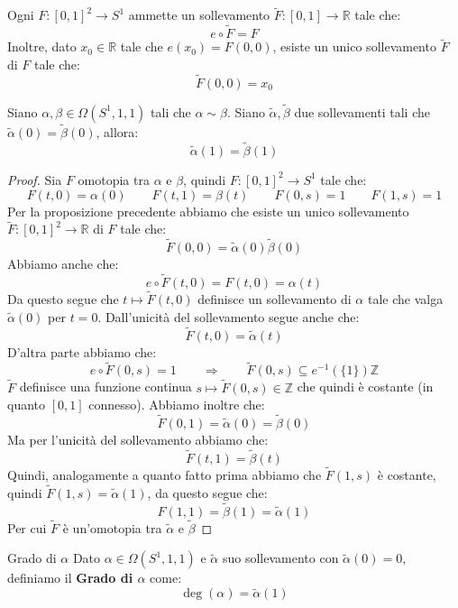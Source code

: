 \documentclass[11pt,a4paper,twoside]{article}
\theoremstyle{definition}
\begin{document}
\begin{prop}{}{}
	Ogni $F:[0,1]^2 \to S^1$ ammette un sollevamento $\tilde F:[0,1] \to \mathbb R$ tale che:
	\[e \circ \tilde F = F \]
	Inoltre, dato $x_0 \in \mathbb R$ tale che $e(x_0) = F(0,0)$, esiste un unico sollevamento $\tilde F$ di $F$ tale che:
	\[ \tilde F(0,0) = x_0 \]
\end{prop}

\begin{cor}{}{}
	Siano $\alpha, \beta \in \Omega(S^1,1,1)$ tali che $\alpha \sim \beta$. Siano $\tilde \alpha, \tilde \beta$ due sollevamenti tali che $\tilde \alpha (0) = \tilde \beta(0)$, allora:
	\[ \tilde \alpha(1) = \tilde \beta(1) \]
\end{cor}

\begin{proof}
	Sia $F$ omotopia tra $\alpha$ e $\beta$, quindi $F:[0,1]^2 \to S^1$ tale che:
	\[ F(t,0) = \alpha(0)\qquad F(t,1) = \beta(t)\qquad F(0,s) = 1\qquad F(1,s) = 1 \]
	Per la proposizione precedente abbiamo che esiste un unico sollevamento $\tilde F:[0,1]^2 \to \mathbb R$ di $F$ tale che:
	\[ \tilde F(0,0) = \tilde \alpha(0) \tilde \beta(0) \]
	Abbiamo anche che:
	\[ e \circ \tilde F(t,0) = F(t,0) = \alpha(t) \]
	Da questo segue che $t \mapsto \tilde F(t,0)$ definisce un sollevamento di $\alpha$ tale che valga $\tilde \alpha(0)$ per $t = 0$. Dall'unicità del sollevamento segue anche che:
	\[ \tilde F(t,0) = \tilde \alpha(t) \]
	D'altra parte abbiamo che:
	\[ e \circ \tilde F(0,s) = 1\qquad \Rightarrow \qquad \tilde F(0,s) \subseteq e^{-1}(\{1\}) \mathbb Z \]
	$\tilde F$ definisce una funzione continua $s \mapsto \tilde F(0,s) \in \mathbb Z$ che quindi è costante (in quanto $[0,1]$ connesso). Abbiamo inoltre che:
	\[ \tilde F(0,1) = \tilde \alpha(0) = \tilde \beta(0)\]
	Ma per l'unicità del sollevamento abbiamo che:
	\[ \tilde F(t,1) = \tilde \beta(t) \]
	Quindi, analogamente a quanto fatto prima abbiamo che $\tilde F(1,s)$ è costante, quindi $\tilde F(1,s) = \tilde \alpha(1)$, da questo segue che:
	\[ F(1,1) = \tilde \beta(1) = \tilde \alpha(1) \]
	Per cui $\tilde F$ è un'omotopia tra $\tilde \alpha$ e $\tilde \beta$
\end{proof}

\begin{defn}{Grado di $\alpha$}{}
	Dato $\alpha \in \Omega(S^1,1,1)$ e $\tilde \alpha$ suo sollevamento con $\tilde \alpha(0) = 0$, definiamo il \textbf{Grado di $\alpha$} come:
	\[ \deg(\alpha) = \tilde \alpha(1) \]
\end{defn}
\end{document}
